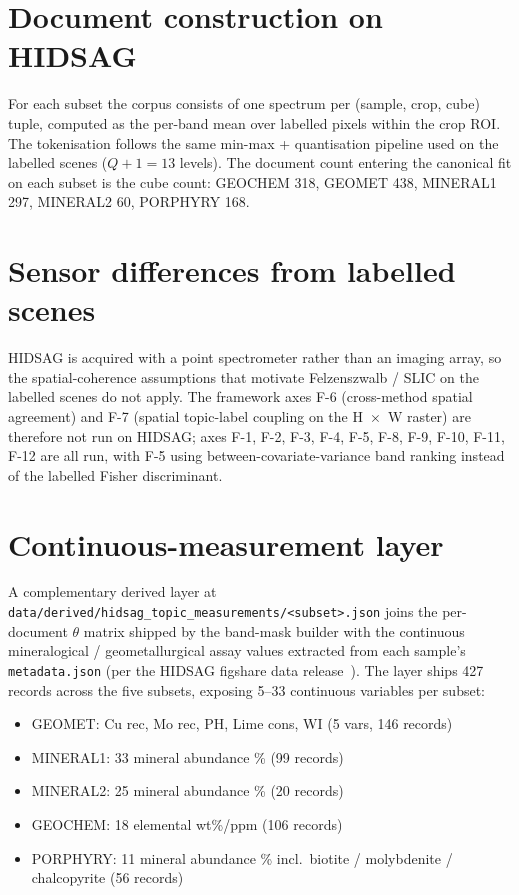\documentclass[11pt,a4paper]{article}
\begin{document}
\section{Document construction on HIDSAG}

For each subset the corpus consists of one spectrum per (sample,
crop, cube) tuple, computed as the per-band mean over labelled
pixels within the crop ROI. The tokenisation follows the same
min-max + quantisation pipeline used on the labelled scenes
($Q + 1 = 13$ levels). The document count entering the canonical
fit on each subset is the cube count: GEOCHEM 318, GEOMET 438,
MINERAL1 297, MINERAL2 60, PORPHYRY 168.

\section{Sensor differences from labelled scenes}

HIDSAG is acquired with a point spectrometer rather than an imaging
array, so the spatial-coherence assumptions that motivate
Felzenszwalb / SLIC on the labelled scenes do not apply. The
framework axes F-6 (cross-method spatial agreement) and F-7
(spatial topic-label coupling on the H~$\times$~W raster) are
therefore not run on HIDSAG; axes F-1, F-2, F-3, F-4, F-5, F-8,
F-9, F-10, F-11, F-12 are all run, with F-5 using
between-covariate-variance band ranking instead of the labelled
Fisher discriminant.

\section{Continuous-measurement layer}

A complementary derived layer at
\texttt{data/derived/hidsag\_topic\_measurements/<subset>.json}
joins the per-document $\theta$ matrix shipped by the band-mask
builder with the continuous mineralogical / geometallurgical assay
values extracted from each sample's \texttt{metadata.json} (per the
HIDSAG figshare data release~\cite{hidsag2023figshare}). The layer
ships 427 records across the five subsets, exposing 5--33 continuous
variables per subset:

\begin{itemize}
\item GEOMET: Cu rec, Mo rec, PH, Lime cons, WI (5 vars, 146 records)
\item MINERAL1: 33 mineral abundance \% (99 records)
\item MINERAL2: 25 mineral abundance \% (20 records)
\item GEOCHEM: 18 elemental wt\%/ppm (106 records)
\item PORPHYRY: 11 mineral abundance \% incl.\ biotite / molybdenite
/ chalcopyrite (56 records)
\end{itemize}
\end{document}
